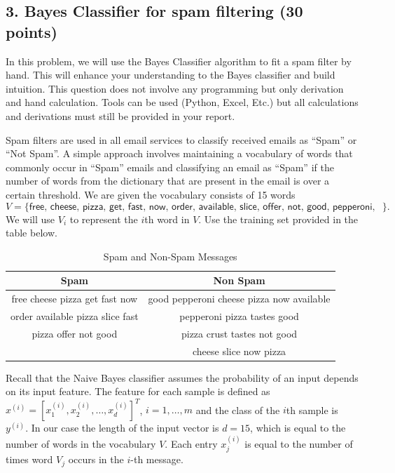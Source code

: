 \documentclass[12pt]{article}
\begin{document}
\subsection*{3. Bayes Classifier for spam filtering (30 points)} 

In this problem, we will use the  Bayes Classifier algorithm to fit a spam filter by hand. This will enhance your understanding to the Bayes classifier and build intuition. This question does not involve any programming but only derivation and hand calculation. Tools can be used (Python, Excel, Etc.) but all calculations and derivations must still be provided in your report.

Spam filters are used in all email services to classify received emails as ``Spam'' or ``Not Spam''. A simple approach involves maintaining a vocabulary of words that commonly occur in ``Spam'' emails and classifying an email as ``Spam'' if the number of words from the dictionary that are present in the email is over a certain threshold.
We are given the vocabulary consists of 15 words \[V=\{\textsf{free, cheese, pizza, get, fast, now, order, available, slice, offer, not, good, pepperoni, tastes, crust}\}.\] We will use $V_i$ to represent the $i$th word in $V$. Use the training set provided in the table below.

\begin{table}[H]
    \centering
    \begin{tabular}{|c|c|}
        \hline
        \textbf{Spam} & \textbf{Non Spam} \\
        \hline
        \textsf{free cheese pizza get fast now} & \textsf{good pepperoni cheese pizza now available} \\
        \hline
        \textsf{order available pizza slice fast} & \textsf{pepperoni pizza tastes good} \\
        \hline
        \textsf{pizza offer not good} & \textsf{pizza crust tastes not good} \\
        \hline
        & \textsf{cheese slice now pizza} \\
        \hline
    \end{tabular}
    \caption{Spam and Non-Spam Messages}
    \label{tab:sentiment_messages}
\end{table}

Recall that the Naive Bayes classifier assumes the probability of an input depends on its input feature. The feature for each sample is defined as
$x^{(i)} = [x_1^{(i)}, x_2^{(i)}, \ldots, x_d^{(i)}]^T$, $i = 1, \ldots, m$ and the class of the $i$th sample is $y^{(i)}$. In our case the length of the input vector is $d = 15$, which is equal to the number of words in the vocabulary $V$. Each entry $x_j^{(i)}$ is equal to the number of times word $V_j$ occurs in the $i$-th message. 
\end{document}

